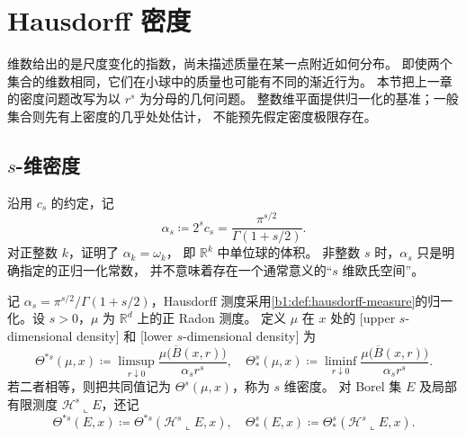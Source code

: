 \section{Hausdorff 密度}
\label{b1:sec:1505}

维数给出的是尺度变化的指数，尚未描述质量在某一点附近如何分布。
即使两个集合的维数相同，它们在小球中的质量也可能有不同的渐近行为。
本节把上一章的密度问题改写为以 \(r^s\) 为分母的几何问题。
整数维平面提供归一化的基准；一般集合则先有上密度的几乎处处估计，
不能预先假定密度极限存在。


\subsection{\texorpdfstring{\(s\)}{s}-维密度}
\label{b1:subsec:150501}

沿用 \(c_s\) 的约定，记
\[
 \alpha_s\coloneqq2^s c_s=\frac{\pi^{s/2}}{\Gamma(1+s/2)}.
\]
对正整数 \(k\)，证明了 \(\alpha_k=\omega_k\)，
即 \(\mathbb R^k\) 中单位球的体积。
非整数 \(s\) 时，\(\alpha_s\) 只是明确指定的正归一化常数，
并不意味着存在一个通常意义的“\(s\) 维欧氏空间”。

\begin{definition}\label{b1:def:hausdorff-density}
记 \(\alpha_s=\pi^{s/2}/\Gamma(1+s/2)\)，Hausdorff 测度采用\cref{b1:def:hausdorff-measure}的归一化。设 \(s>0\)，\(\mu\) 为 \(\mathbb R^d\) 上的正 Radon 测度。
定义 \(\mu\) 在 \(x\) 处的 [upper \(s\)-dimensional density]
和 [lower \(s\)-dimensional density] 为
\[
 \Theta^{*s}(\mu,x)\coloneqq
 \limsup_{r\downarrow0}\frac{\mu\bigl(\overline B(x,r)\bigr)}{\alpha_s r^s},
 \quad
 \Theta_*^s(\mu,x)\coloneqq
 \liminf_{r\downarrow0}\frac{\mu\bigl(\overline B(x,r)\bigr)}{\alpha_s r^s}.
\]
若二者相等，则把共同值记为 \(\Theta^s(\mu,x)\)，称为 \(s\) 维密度。
对 Borel 集 \(E\) 及局部有限测度 \(\mathcal H^s\llcorner E\)，还记
\[
 \Theta^{*s}(E,x)\coloneqq\Theta^{*s}(\mathcal H^s\llcorner E,x),
 \quad
 \Theta_*^s(E,x)\coloneqq\Theta_*^s(\mathcal H^s\llcorner E,x).
\]
\end{definition}

